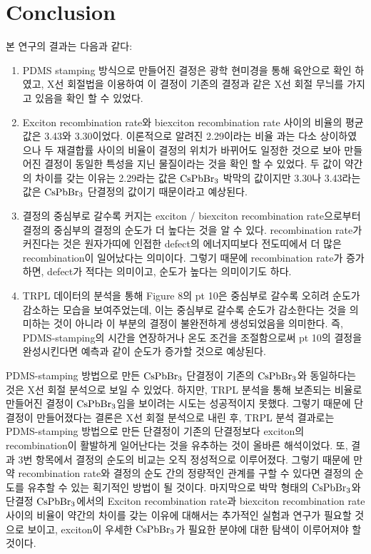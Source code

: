 \newpage

\section{Conclusion}
본 연구의 결과는 다음과 같다:
\begin{enumerate} 
	\item PDMS stamping 방식으로 만들어진 결정은 광학 현미경을 통해 육안으로 확인 하였고, X선 회절법을 이용하여 이 결정이 기존의 결정과 같은 X선 회절 무늬를 가지고 있음을 확인 할 수 있었다.
	\item	
	Exciton recombination rate와 biexciton recombination rate 사이의 비율의 평균값은 3.43와 3.30이었다. 이론적으로 알려진 2.29이라는 비율\cite{chen2018room} 과는 다소 상이하였으나 두 재결합률 사이의 비율이 결정의 위치가 바뀌어도 일정한 것으로 보아 만들어진 결정이 동일한 특성을 지닌 물질이라는 것을 확인 할 수 있었다. 두 값이 약간의 차이를 갖는 이유는 2.29라는 값은 $\rm{CsPbBr_3}$ 박막의 값이지만 3.30나 3.43라는 값은 $\rm{CsPbBr_3}$ 단결정의 값이기 때문이라고 예상된다.  
	\item 결정의 중심부로 갈수록 커지는 exciton / biexciton recombination rate으로부터 결정의 중심부의 결정의 순도가 더 높다는 것을 알 수 있다. recombination rate가 커진다는 것은 원자가띠에 인접한 defect의 에너지띠보다 전도띠에서 더 많은 recombination이 일어났다는 의미이다. 그렇기 때문에 recombination rate가 증가하면, defect가 적다는 의미이고, 순도가 높다는 의미이기도 하다.
	\item TRPL 데이터의 분석을 통해 Figure 8의 pt 10은 중심부로 갈수록 오히려 순도가 감소하는 모습을 보여주었는데, 이는 중심부로 갈수록 순도가 감소한다는 것을 의미하는 것이 아니라 이 부분의 결정이 불완전하게 생성되었음을 의미한다. 즉, PDMS-stamping의 시간을 연장하거나 온도 조건을 조절함으로써 pt 10의 결정을 완성시킨다면 예측과 같이 순도가 증가할 것으로 예상된다. 
\end{enumerate}
PDMS-stamping 방법으로 만든 $\rm{CsPbBr_3}$ 단결정이 기존의 $\rm{CsPbBr_3}$와 동일하다는 것은 X선 회절 분석으로 보일 수 있었다. 하지만, TRPL 분석을 통해 보존되는 비율로 만들어진 결정이 $\rm{CsPbBr_3}$임을 보이려는 시도는 성공적이지 못했다. 그렇기 때문에 단결정이 만들어졌다는 결론은 X선 회절 분석으로 내린 후, TRPL 분석 결과로는 PDMS-stamping 방법으로 만든 단결정이 기존의 단결정보다 exciton의 recombination이 활발하게 일어난다는 것을 유추하는 것이 올바른 해석이었다.  
또, 결과 3번 항목에서 결정의 순도의 비교는 오직 정성적으로 이루어졌다. 그렇기 때문에 만약 recombination rate와 결정의 순도 간의 정량적인 관계를 구할 수 있다면 결정의 순도를 유추할 수 있는 획기적인 방법이 될 것이다.
마지막으로 박막 형태의 $\rm{CsPbBr_3}$와 단결정 $\rm{CsPbBr_3}$에서의 Exciton recombination rate과 biexciton recombination rate 사이의 비율이 약간의 차이를 갖는 이유에 대해서는 추가적인 실험과 연구가 필요할 것으로 보이고, exciton이 우세한 $\rm{CsPbBr_3}$가 필요한 분야에 대한 탐색이 이루어져야 할 것이다. 


